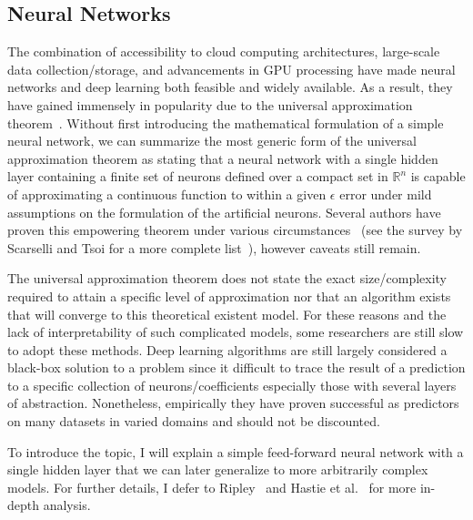\subsection{Neural Networks}

The combination of accessibility to cloud computing architectures, large-scale data collection/storage, and advancements in GPU processing have made neural networks and deep learning both feasible and widely available.
%
As a result, they have gained immensely in popularity due to the universal approximation theorem~\cite{Cybenko1989,Funahashi1989,Hecht-Nielsen1987,HornikStinchcombeWhite1989}.
%
Without first introducing the mathematical formulation of a simple neural network, we can summarize the most generic form of the universal approximation theorem as stating that a neural network with a single hidden layer containing a finite set of neurons defined over a compact set in $\mathbb{R}^n$ is capable of approximating a continuous function to within a given $\epsilon$ error under mild assumptions on the formulation of the artificial neurons.
%
Several authors have proven this empowering theorem under various circumstances~\cite{Hornik1991,Hornik1993,Huang2003,HuangBabri1998,IrieMiyake1988,Kurkova1992,LeshnoLinPinkus1993,ParkSandberg1991} (see the survey by Scarselli and Tsoi for a more complete list~\cite{ScarselliTsoi1998}), however caveats still remain.

The universal approximation theorem does not state the exact size/complexity required to attain a specific level of approximation nor that an algorithm exists that will converge to this theoretical existent model.
%
For these reasons and the lack of interpretability of such complicated models, some researchers are still slow to adopt these methods.
%
Deep learning algorithms are still largely considered a black-box solution to a problem since it difficult to trace the result of a prediction to a specific collection of neurons/coefficients especially those with several layers of abstraction.
%
Nonetheless, empirically they have proven successful as predictors on many datasets in varied domains and should not be discounted.
%

%
To introduce the topic, I will explain a simple feed-forward neural network with a single hidden layer that we can later generalize to more arbitrarily complex models.
%
For further details, I defer to Ripley~\cite{Ripley1996} and Hastie et al.~\cite{HastieTibshiraniFriedman2008} for more in-depth analysis.

